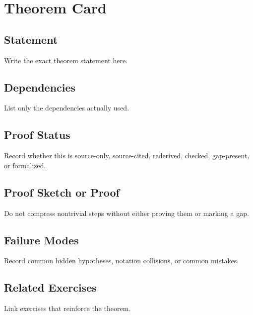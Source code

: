 

\section*{Theorem Card}

\subsection*{Statement}

Write the exact theorem statement here.

\subsection*{Dependencies}

List only the dependencies actually used.

\subsection*{Proof Status}

Record whether this is source-only, source-cited, rederived, checked, gap-present, or formalized.

\subsection*{Proof Sketch or Proof}

Do not compress nontrivial steps without either proving them or marking a gap.

\subsection*{Failure Modes}

Record common hidden hypotheses, notation collisions, or common mistakes.

\subsection*{Related Exercises}

Link exercises that reinforce the theorem.